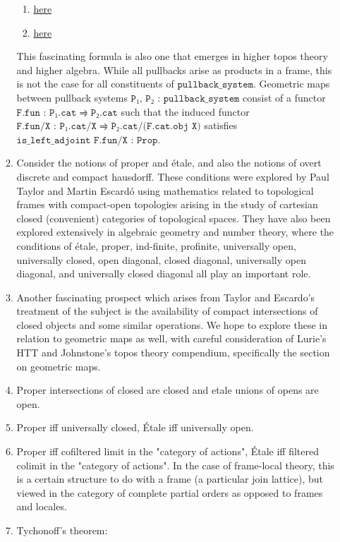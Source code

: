 \documentclass{book}
\begin{document}
\begin{enumerate}
\begin{enumerate}
\begin{enumerate}
\item \href{https://ncatlab.org/nlab/show/closed+morphism}{here}
\item \href{https://ncatlab.org/nlab/show/open+morphism}{here}
\end{enumerate} 
This fascinating formula is also one that emerges in higher topos theory and higher algebra. While all pullbacks arise as products in a frame, this is not the case for all constituents of $\texttt{pullback\_system}$. Geometric maps between pullback systems $\texttt{P₁, P₂ : pullback\_system}$ consist of a functor $\texttt{F.fun : P₁.cat ⥤ P₂.cat}$ such that the induced functor $\texttt{F.fun⁄X : P₁.cat⁄X ⥤ P₂.cat⁄(F.cat.obj X)}$ satisfies $\texttt{is\_left\_adjoint F.fun⁄X : Prop}$.
\item Consider the notions of proper and étale, and also the notions of overt discrete and compact hausdorff. These conditions were explored by Paul Taylor and Martin Escardó using mathematics related to topological frames with compact-open topologies arising in the study of cartesian closed (convenient) categories of topological spaces. They have also been explored extensively in algebraic geometry and number theory, where the conditions of étale, proper, ind-finite, profinite, universally open, universally closed, open diagonal, closed diagonal, universally open diagonal, and universally closed diagonal all play an important role. 
\item Another fascinating prospect which arises from Taylor and Escardo's treatment of the subject is the availability of compact intersections of closed objects and some similar operations. We hope to explore these in relation to geometric maps as well, with careful consideration of Lurie's HTT and Johnstone's topos theory compendium, specifically the section on geometric maps. 
\item Proper intersections of closed are closed and etale unions of opens are open.
\item Proper iff universally closed, Étale iff universally open.
\item Proper iff cofiltered limit in the "category of actions", Étale iff filtered colimit in the "category of actions". In the case of frame-local theory, this is a certain structure to do with a frame (a particular join lattice), but viewed in the category of complete partial orders as opposed to frames and locales.
\item Tychonoff's theorem: 
\end{enumerate}

\end{enumerate}
\end{document}
